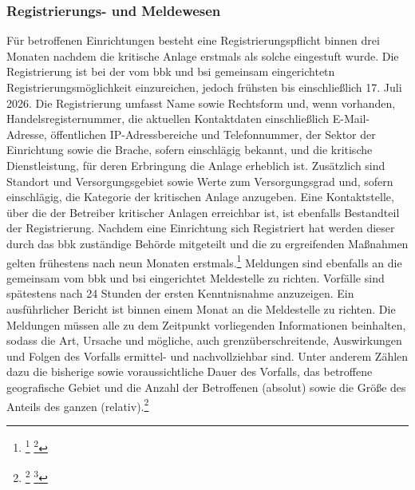 \documentclass[11pt,a4paper,hidelinks]{article}   %
\begin{document}
            \subsubsection{Registrierungs- und Meldewesen}
                Für betroffenen Einrichtungen besteht eine Registrierungspflicht binnen drei Monaten nachdem die kritische Anlage erstmals als solche eingestuft wurde. Die Registrierung ist bei der vom \gls{bbk} und \gls{bsi} gemeinsam eingerichtetn Registrierungsmöglichkeit einzureichen, jedoch frühsten bis einschließlich 17. Juli 2026. Die Registrierung umfasst Name sowie Rechtsform und, wenn vorhanden, Handelsregisternummer, die aktuellen Kontaktdaten einschließlich E-Mail-Adresse, öffentlichen IP-Adressbereiche und Telefonnummer, der Sektor der Einrichtung sowie die Brache, sofern einschlägig bekannt, und die kritische Dienstleistung, für deren Erbringung die Anlage erheblich ist. Zusätzlich sind Standort und Versorgungsgebiet sowie Werte zum Versorgungsgrad und, sofern einschlägig, die Kategorie der kritischen Anlage anzugeben. Eine Kontaktstelle, über die der Betreiber kritischer Anlagen erreichbar ist, ist ebenfalls Bestandteil der Registrierung. Nachdem eine Einrichtung sich Registriert hat werden dieser durch das \gls{bbk} zuständige Behörde mitgeteilt und die zu ergreifenden Maßnahmen gelten frühestens nach neun Monaten erstmals.\footnote{
                    \footcite[Vgl.][, §5, Absatz 1]{KRITIS-DachG}
                    \footcite[Vgl.][, §8]{KRITIS-DachG}
                }
                Meldungen sind ebenfalls an die gemeinsam vom \gls{bbk} und \gls{bsi} eingerichtet Meldestelle zu richten. Vorfälle sind spätestens nach 24 Stunden der ersten Kenntnisnahme anzuzeigen. Ein ausführlicher Bericht ist binnen einem Monat an die Meldestelle zu richten. Die Meldungen müssen alle zu dem Zeitpunkt vorliegenden Informationen beinhalten, sodass die Art, Ursache und mögliche, auch grenzüberschreitende, Auswirkungen und Folgen des Vorfalls ermittel- und nachvollziehbar sind. Unter anderem Zählen dazu die bisherige sowie voraussichtliche Dauer des Vorfalls, das betroffene geografische Gebiet und die Anzahl der Betroffenen (absolut) sowie die Größe des Anteils des ganzen (relativ).\footnote{
                    \footcite[Vgl.][, §18]{KRITIS-DachG}
                    \footcite[Vgl.][, §32, Absatz 1]{NIS2UmsuCG}
                }
\end{document}

